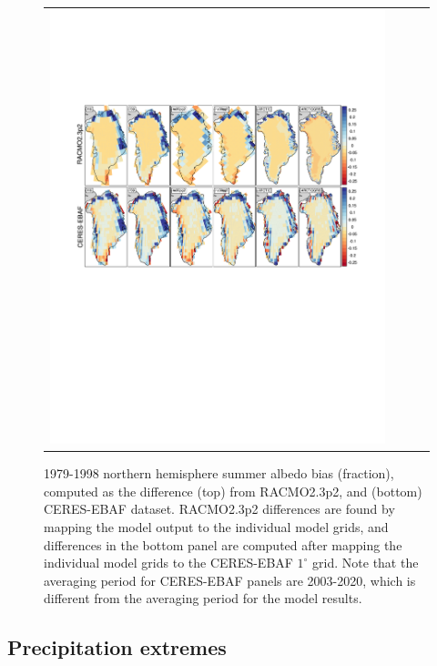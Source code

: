 \documentclass[draft]{agujournal2019}
\begin{document}
\begin{figure}[t]
\begin{center}
\begin{tabular}{cccc}
         \includegraphics[width=130mm]{temp_contours_diffALB.pdf}
\end{tabular}
\end{center}
\caption{1979-1998 northern hemisphere summer albedo bias (fraction), computed as the difference (top) from RACMO2.3p2, and (bottom) CERES-EBAF dataset. RACMO2.3p2 differences are found by mapping the model output to the individual model grids, and differences in the bottom panel are computed after mapping the individual model grids to the CERES-EBAF $1^{\circ}$ grid. Note that the averaging period for CERES-EBAF panels are 2003-2020, which is different from the averaging period for the model results.}
\label{fig:alb}
\end{figure}

\subsection{Precipitation extremes}
\end{document}
